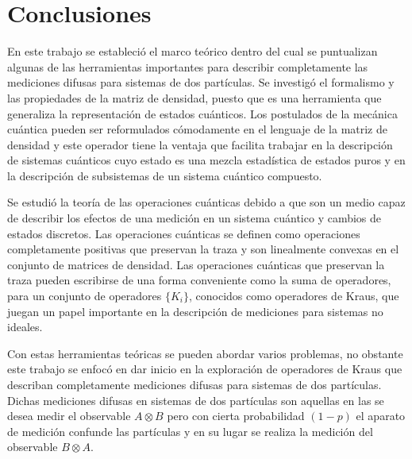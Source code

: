 \chapter{Conclusiones }

En este trabajo se estableció el marco teórico dentro del cual se puntualizan algunas de las herramientas importantes para describir completamente las mediciones difusas para sistemas de dos partículas. Se investigó el formalismo y las propiedades de la matriz de densidad, puesto que es una herramienta que generaliza la representación de estados cuánticos. Los postulados de la mecánica cuántica pueden ser reformulados cómodamente en el lenguaje de la matriz de densidad y este operador tiene la ventaja que facilita trabajar en la descripción de sistemas cuánticos cuyo estado es una mezcla estadística de estados puros y en la descripción de subsistemas de un sistema cuántico compuesto. 

Se estudió la teoría de las operaciones cuánticas debido a que son un medio capaz de describir los efectos de una medición en un sistema cuántico y cambios de estados discretos. Las operaciones cuánticas se definen como operaciones completamente positivas que preservan la traza y son linealmente convexas en el conjunto de matrices de densidad. Las operaciones cuánticas que preservan la traza pueden escribirse de una forma conveniente como la suma de operadores, para un conjunto de operadores $\{K_i\}$, conocidos como operadores de Kraus, que juegan un papel importante en la descripción de mediciones para sistemas no ideales. 

Con estas herramientas teóricas se pueden abordar varios problemas, no obstante este trabajo se enfocó en dar inicio en la exploración de operadores de Kraus que describan completamente mediciones difusas para sistemas de dos partículas. Dichas mediciones difusas en sistemas de dos partículas son aquellas en las se desea medir el observable $A\otimes B$ pero con cierta probabilidad $(1-p)$ el aparato de medición confunde las partículas y en su lugar se realiza la medición del observable $B\otimes A $.  %



